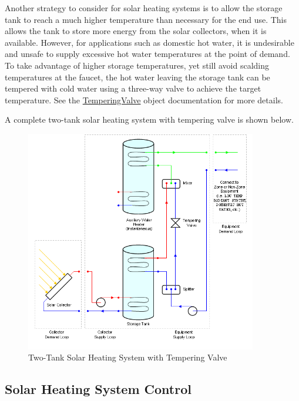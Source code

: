 Another strategy to consider for solar heating systems is to allow the storage tank to reach a much higher temperature than necessary for the end use. This allows the tank to store more energy from the solar collectors, when it is available. However, for applications such as domestic hot water, it is undesirable and unsafe to supply excessive hot water temperatures at the point of demand. To take advantage of higher storage temperatures, yet still avoid scalding temperatures at the faucet, the hot water leaving the storage tank can be tempered with cold water using a three-way valve to achieve the target temperature. See the \hyperref[temperingvalve]{TemperingValve} object documentation for more details.

A complete two-tank solar heating system with tempering valve is shown below.

\begin{figure}[hbtp] %
\centering
\includegraphics[width=0.9\textwidth, height=0.9\textheight, keepaspectratio=true]{media/image341.png}
\caption{Two-Tank Solar Heating System with Tempering Valve \protect \label{fig:two-tank-solar-heating-system-with-tempering}}
\end{figure}

\subsection{Solar Heating System Control}\label{solar-heating-system-control}

